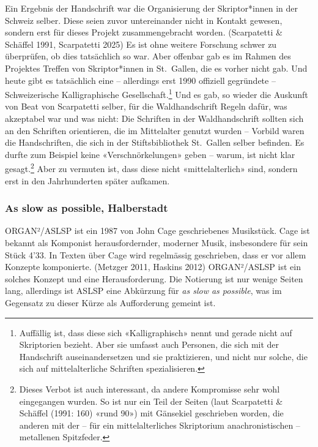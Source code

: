 \documentclass[a4paper,
fontsize=11pt,
oneside,
numbers=noperiodatend,
parskip=half-,
bibliography=totoc,
final
]{scrartcl}
\begin{document}
Ein Ergebnis der Handschrift war die Organisierung der Skriptor*innen in
der Schweiz selber. Diese seien zuvor untereinander nicht in Kontakt
gewesen, sondern erst für dieses Projekt zusammengebracht worden.
(Scarpatetti \& Schäffel 1991, Scarpatetti 2025) Es ist ohne weitere
Forschung schwer zu überprüfen, ob dies tatsächlich so war. Aber
offenbar gab es im Rahmen des Projektes Treffen von Skriptor*innen in
St.~Gallen, die es vorher nicht gab. Und heute gibt es tatsächlich eine
-- allerdings erst 1990 offiziell gegründete -- Schweizerische
Kalligraphische Gesellschaft.\footnote{Auffällig ist, dass diese sich
  «Kalligraphisch» nennt und gerade nicht auf Skriptorien bezieht. Aber
  sie umfasst auch Personen, die sich mit der Handschrift
  auseinandersetzen und sie praktizieren, und nicht nur solche, die sich
  auf mittelalterliche Schriften spezialisieren.} Und es gab, so wieder
die Auskunft von Beat von Scarpatetti selber, für die Waldhandschrift
Regeln dafür, was akzeptabel war und was nicht: Die Schriften in der
Waldhandschrift sollten sich an den Schriften orientieren, die im
Mittelalter genutzt wurden -- Vorbild waren die Handschriften, die sich
in der Stiftsbibliothek St.~Gallen selber befinden. Es durfte zum
Beispiel keine «Verschnörkelungen» geben -- warum, ist nicht klar
gesagt.\footnote{Dieses Verbot ist auch interessant, da andere
  Kompromisse sehr wohl eingegangen wurden. So ist nur ein Teil der
  Seiten (laut Scarpatetti \& Schäffel (1991: 160) «rund 90») mit
  Gänsekiel geschrieben worden, die anderen mit der -- für ein
  mittelalterliches Skriptorium anachronistischen -- metallenen
  Spitzfeder.} Aber zu vermuten ist, dass diese nicht «mittelalterlich»
sind, sondern erst in den Jahrhunderten später aufkamen.

\subsubsection{As slow as possible,
Halberstadt}\label{as-slow-as-possible-halberstadt}

ORGAN²/ASLSP ist ein 1987 von John Cage geschriebenes Musikstück. Cage
ist bekannt als Komponist herausfordernder, moderner Musik, insbesondere
für sein Stück 4'33. In Texten über Cage wird regelmässig geschrieben,
dass er vor allem Konzepte komponierte. (Metzger 2011, Haskins 2012)
ORGAN²/ASLSP ist ein solches Konzept und eine Herausforderung. Die
Notierung ist nur wenige Seiten lang, allerdings ist ASLSP eine
Abkürzung für \emph{as slow as possible}, was im Gegensatz zu dieser
Kürze als Aufforderung gemeint ist.
\end{document}
